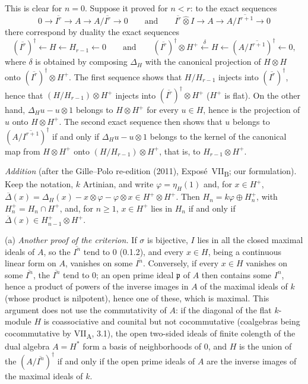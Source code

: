 This is clear for \(n=0\). Suppose it proved for \(n<r\): to the exact
sequences
\[
  0\longrightarrow\overline{I^r}\longrightarrow A\longrightarrow
  A/\overline{I^r}\longrightarrow0
  \qquad\text{and}\qquad
  \overline{I^r}\widehat{\otimes}I\longrightarrow A\longrightarrow
  A/\overline{I^{r+1}}\longrightarrow0
\]
there correspond by duality the exact sequences
\[
  (\overline{I^r})^\dagger\longleftarrow H\longleftarrow H_{r-1}
  \longleftarrow0
  \qquad\text{and}\qquad
  (\overline{I^r})^\dagger\otimes H^+\xleftarrow{\ \delta\ }H\longleftarrow
  (A/\overline{I^{r+1}})^\dagger\longleftarrow0,
\]
where \(\delta\) is obtained by composing \(\Delta_H\) with the canonical
projection of \(H\otimes H\) onto \((\overline{I^r})^\dagger\otimes H^+\).
The first sequence shows that \(H/H_{r-1}\) injects into
\((\overline{I^r})^\dagger\), hence that \((H/H_{r-1})\otimes H^+\) injects
into \((\overline{I^r})^\dagger\otimes H^+\) (\(H^+\) is flat). On the
other hand, \(\Delta_Hu-u\otimes1\) belongs to \(H\otimes H^+\) for every
\(u\in H\), hence is the projection of \(u\) onto \(H\otimes H^+\). The
second exact sequence then shows that \(u\) belongs to
\((A/\overline{I^{r+1}})^\dagger\) if and only if \(\Delta_Hu-u\otimes1\)
belongs to the kernel of the canonical map from \(H\otimes H^+\) onto
\((H/H_{r-1})\otimes H^+\), that is, to \(H_{r-1}\otimes H^+\).

\medskip\noindent
{}\label{sga3:VIIB:1.3.6.A}%
\emph{Addition} (after the Gille--Polo re-edition (2011), Expos\'e~VII\textsubscript{B}; our formulation).
Keep the notation, \(k\) Artinian, and write \(\varphi=\eta_H(1)\) and, for \(x\in H^+\),
\(\overline\Delta(x)=\Delta_H(x)-x\otimes\varphi-\varphi\otimes x\in H^+\otimes H^+\). Then
\(H_n=k\varphi\oplus H_n^+\), with \(H_n^+=H_n\cap H^+\), and, for \(n\ge1\), \(x\in H^+\) lies in
\(H_n\) if and only if \(\overline\Delta(x)\in H_{n-1}^+\otimes H^+\).

(a) \emph{Another proof of the criterion.} If \(\sigma\) is bijective, \(I\) lies in all the closed maximal
ideals of \(A\), so the \(\overline{I^n}\) tend to \(0\) (0.1.2), and every \(x\in H\), being a continuous linear
form on \(A\), vanishes on some \(\overline{I^n}\). Conversely, if every \(x\in H\) vanishes on some
\(\overline{I^n}\), the \(\overline{I^n}\) tend to \(0\); an open prime ideal \(\mathfrak p\) of \(A\) then
contains some \(I^n\), hence a product of powers of the inverse images in \(A\) of the maximal ideals of
\(k\) (whose product is nilpotent), hence one of these, which is maximal. This argument does not use the
commutativity of \(A\): if the diagonal of the flat \(k\)-module \(H\) is coassociative and counital but
not cocommutative (coalgebras being cocommutative by VII\textsubscript{A}, 3.1), the open two-sided ideals of
finite colength of the dual algebra \(A=H^*\) form a basis of neighborhoods of \(0\), and \(H\) is
the union of the \((A/\overline{I^n})^\dagger\) if and only if the open prime ideals of \(A\) are the inverse
images of the maximal ideals of \(k\).

